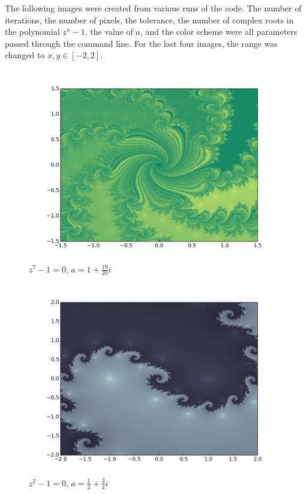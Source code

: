\documentclass[12pt]{article}
\begin{document}
\noindent The following images were created from various runs of the code.  The number of iterations, the number of pixels, the tolerance, the number of complex roots in the polynomial $z^n - 1$, the value of $a$, and the color scheme were all parameters passed through the command line.  For the last four images, the range was changed to $x, y \in [-2, 2]$.

\begin{figure}[H]
    \centerline{
        \includegraphics[scale=1.1]{fractal_500_2500_7.png}
    }
    \caption*{$z^7 - 1 = 0$, $a = 1 + \frac{19}{20}i$}
\end{figure}
\begin{figure}[H]
    \centerline{
        \includegraphics[scale=0.63]{fractal_250_1500_2.png}
    }
    \caption*{$z^2 - 1 = 0$, $a = \frac{1}{2} + \frac{3}{4}i$}
\end{figure}
\end{document}
